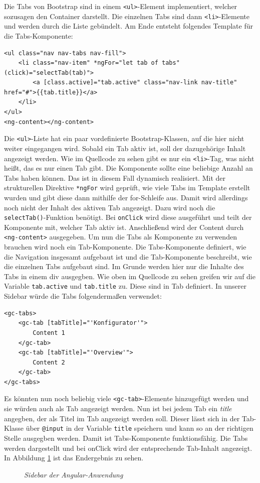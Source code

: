 Die Tabs von Bootstrap sind in einem \texttt{<ul>}-Element implementiert, welcher sozusagen den Container darstellt. Die einzelnen Tabs sind dann \texttt{<li>}-Elemente und werden durch die Liste gebündelt. Am Ende entsteht folgendes Template für die Tabs-Komponente:
%
\begin{lstlisting}[caption={Ausschnitt der Tabs-Klasse},label=lst:tabsclass]
<ul class="nav nav-tabs nav-fill">
	<li class="nav-item" *ngFor="let tab of tabs" (click)="selectTab(tab)">
		<a [class.active]="tab.active" class="nav-link nav-title" href="#">{{tab.title}}</a>
	</li>
</ul>
<ng-content></ng-content>
\end{lstlisting}
%
Die \texttt{<ul>}-Liste hat ein paar vordefinierte Bootstrap-Klassen, auf die hier nicht weiter eingegangen wird. Sobald ein Tab aktiv ist, soll der dazugehörige Inhalt angezeigt werden. Wie im Quellcode zu sehen gibt es nur ein \texttt{<li>}-Tag, was nicht heißt, das es nur einen Tab gibt. Die Komponente sollte eine beliebige Anzahl an Tabs haben können. Das ist in diesem Fall dynamisch realisiert. Mit der strukturellen Direktive \texttt{*ngFor} wird geprüft, wie viele Tabs im Template erstellt wurden und gibt diese dann mithilfe der for-Schleife aus. Damit wird allerdings noch nicht der Inhalt des aktiven Tab angezeigt. Dazu wird noch die \texttt{selectTab()}-Funktion benötigt. Bei \texttt{onClick} wird diese ausgeführt und teilt der Komponente mit, welcher Tab aktiv ist. Anschließend wird der Content durch \texttt{<ng-content>} ausgegeben. Um nun die Tabs als Komponente zu verwenden brauchen wird noch ein Tab-Komponente. Die Tabs-Komponente definiert, wie die Navigation insgesamt aufgebaut ist und die Tab-Komponente beschreibt, wie die einzelnen Tabs aufgebaut sind. Im Grunde werden hier nur die Inhalte des Tabs in einem div ausgegben. Wie oben im Quellcode zu sehen greifen wir auf die Variable \texttt{tab.active} und \texttt{tab.title} zu. Diese sind in Tab definiert. In unserer Sidebar würde die Tabs folgendermaßen verwendet:
%
\begin{lstlisting}[caption={Umsetzung der Tab-Navigation},label=lst:tab-navigation]
<gc-tabs>
	<gc-tab [tabTitle]="'Konfigurator'">
		Content 1
	</gc-tab>
	<gc-tab [tabTitle]="'Overview'">
		Content 2
	</gc-tab>
</gc-tabs>
\end{lstlisting}
%
Es könnten nun noch beliebig viele \texttt{<gc-tab>}-Elemente hinzugefügt werden und sie würden auch als Tab angezeigt werden. Nun ist bei jedem Tab ein \textit{title} angegben, der als Titel im Tab angezeigt werden soll. Dieser lässt sich in der Tab-Klasse über \texttt{@input} in der Variable \texttt{title} speichern und kann so an der richtigen Stelle ausgegben werden. Damit ist Tabs-Komponente funktionsfähig. Die Tabs werden dargestellt und bei onClick wird der entsprechende Tab-Inhalt angezeigt. In Abbildung \ref{fig:sidebar} ist das Endergebnis zu sehen.\\
\begin{figure}[h]
	\centering
	{}
	\caption[Sidebar des Konfigurators]{\textit{Sidebar der Angular-Anwendung}}
	\label{fig:sidebar}
\end{figure}


